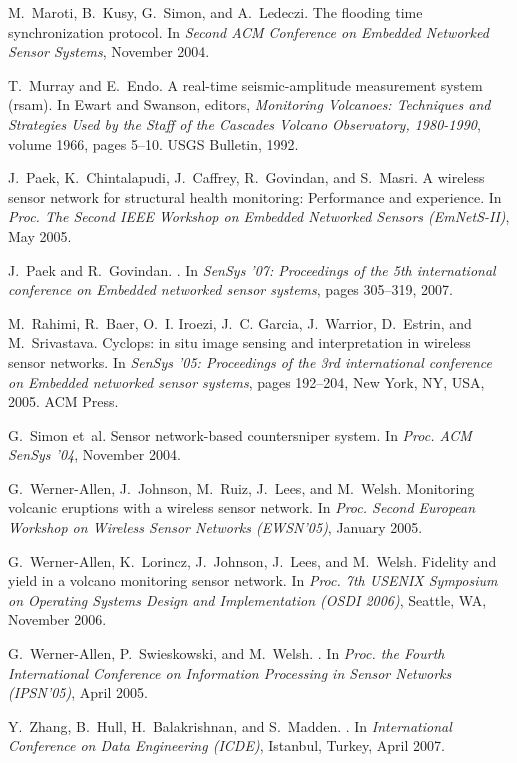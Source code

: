 \documentclass[lettersize]{sig-alternate-konrad}
\begin{document}
\begin{thebibliography}{10}
M.~Maroti, B.~Kusy, G.~Simon, and A.~Ledeczi.
\newblock The flooding time synchronization protocol.
\newblock In {\em Second ACM Conference on Embedded Networked Sensor Systems},
  November 2004.

T.~Murray and E.~Endo.
\newblock A real-time seismic-amplitude measurement system (rsam).
\newblock In Ewart and Swanson, editors, {\em Monitoring Volcanoes: Techniques
  and Strategies Used by the Staff of the Cascades Volcano Observatory,
  1980-1990}, volume 1966, pages 5--10. USGS Bulletin, 1992.

\vfill\eject

J.~Paek, K.~Chintalapudi, J.~Caffrey, R.~Govindan, and S.~Masri.
\newblock A wireless sensor network for structural health monitoring:
  Performance and experience.
\newblock In {\em Proc. The Second IEEE Workshop on Embedded Networked Sensors
  (EmNetS-II)}, May 2005.

J.~Paek and R.~Govindan.
.
\newblock In {\em SenSys '07: Proceedings of the 5th international conference
  on Embedded networked sensor systems}, pages 305--319, 2007.

M.~Rahimi, R.~Baer, O.~I. Iroezi, J.~C. Garcia, J.~Warrior, D.~Estrin, and
  M.~Srivastava.
\newblock Cyclops: in situ image sensing and interpretation in wireless sensor
  networks.
\newblock In {\em SenSys '05: Proceedings of the 3rd international conference
  on Embedded networked sensor systems}, pages 192--204, New York, NY, USA,
  2005. ACM Press.

G.~Simon et~al.
\newblock Sensor network-based countersniper system.
\newblock In {\em Proc. ACM SenSys '04}, November 2004.

G.~Werner-Allen, J.~Johnson, M.~Ruiz, J.~Lees, and M.~Welsh.
\newblock Monitoring volcanic eruptions with a wireless sensor network.
\newblock In {\em Proc. Second European Workshop on Wireless Sensor Networks
  (EWSN'05)}, January 2005.

G.~Werner-Allen, K.~Lorincz, J.~Johnson, J.~Lees, and M.~Welsh.
\newblock Fidelity and yield in a volcano monitoring sensor network.
\newblock In {\em Proc. 7th USENIX Symposium on Operating Systems Design and
  Implementation (OSDI 2006)}, Seattle, WA, November 2006.

G.~Werner-Allen, P.~Swieskowski, and M.~Welsh.
.
\newblock In {\em Proc. the Fourth International Conference on Information
  Processing in Sensor Networks (IPSN'05)}, April 2005.

Y.~Zhang, B.~Hull, H.~Balakrishnan, and S.~Madden.
.
\newblock In {\em International Conference on Data Engineering (ICDE)},
  Istanbul, Turkey, April 2007.

\end{thebibliography}
\end{document}
